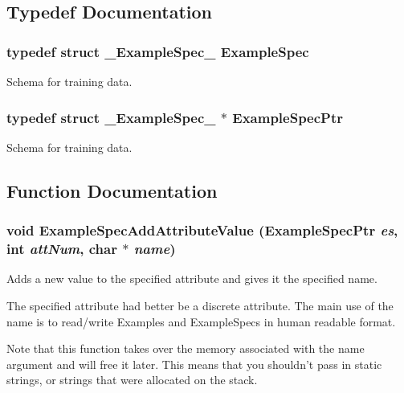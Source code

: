 \subsection{Typedef Documentation}
\subsubsection{\setlength{\rightskip}{0pt plus 5cm}typedef struct {\bf \_\-Example\-Spec\_\-}  {\bf Example\-Spec}}\label{ExampleSpec_8h_a8}


Schema for training data. 

\subsubsection{\setlength{\rightskip}{0pt plus 5cm}typedef struct {\bf \_\-Example\-Spec\_\-} $\ast$ {\bf Example\-Spec\-Ptr}}\label{ExampleSpec_8h_a9}


Schema for training data. 



\subsection{Function Documentation}
\subsubsection{\setlength{\rightskip}{0pt plus 5cm}void Example\-Spec\-Add\-Attribute\-Value ({\bf Example\-Spec\-Ptr} {\em es}, int {\em att\-Num}, char $\ast$ {\em name})}\label{ExampleSpec_8h_a30}


Adds a new value to the specified attribute and gives it the specified name. 

The specified attribute had better be a discrete attribute. The main use of the name is to read/write Examples and Example\-Specs in human readable format.

Note that this function takes over the memory associated with the name argument and will free it later. This means that you shouldn't pass in static strings, or strings that were allocated on the stack. 
